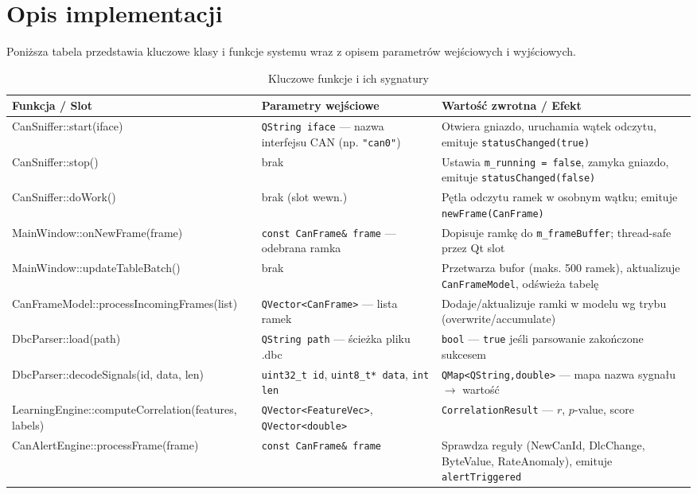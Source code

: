 \documentclass[12pt, a4paper]{article}
\begin{document}
\section{Opis implementacji}

Poniższa tabela przedstawia kluczowe klasy i funkcje systemu wraz z opisem
parametrów wejściowych i wyjściowych.

\begin{table}[H]
\caption{Kluczowe funkcje i ich sygnatury}
\label{tab:functions}
\centering
\small
\begin{tabular}{p{4.8cm}p{4.5cm}p{5.5cm}}
\toprule
\textbf{Funkcja / Slot} & \textbf{Parametry wejściowe} & \textbf{Wartość zwrotna / Efekt} \\
\midrule
\ttfamily CanSniffer::start(iface) &
  \texttt{QString iface} --- nazwa interfejsu CAN (np. \texttt{"can0"}) &
  Otwiera gniazdo, uruchamia wątek odczytu, emituje \texttt{statusChanged(true)} \\
\rowcolor{blue!3}
\ttfamily CanSniffer::stop() &
  brak &
  Ustawia \texttt{m\_running = false}, zamyka gniazdo, emituje \texttt{statusChanged(false)} \\
\ttfamily CanSniffer::doWork() &
  brak (slot wewn.) &
  Pętla odczytu ramek w osobnym wątku; emituje \texttt{newFrame(CanFrame)} \\
\rowcolor{blue!3}
\ttfamily MainWindow::onNewFrame(frame) &
  \texttt{const CanFrame\& frame} --- odebrana ramka &
  Dopisuje ramkę do \texttt{m\_frameBuffer}; thread-safe przez Qt slot \\
\ttfamily MainWindow::updateTableBatch() &
  brak &
  Przetwarza bufor (maks. 500 ramek), aktualizuje \texttt{CanFrameModel}, odświeża tabelę \\
\rowcolor{blue!3}
\ttfamily CanFrameModel::processIncomingFrames(list) &
  \texttt{QVector<CanFrame>} --- lista ramek &
  Dodaje/aktualizuje ramki w modelu wg trybu (overwrite/accumulate) \\
\ttfamily DbcParser::load(path) &
  \texttt{QString path} --- ścieżka pliku .dbc &
  \texttt{bool} --- \texttt{true} jeśli parsowanie zakończone sukcesem \\
\rowcolor{blue!3}
\ttfamily DbcParser::decodeSignals(id, data, len) &
  \texttt{uint32\_t id}, \texttt{uint8\_t* data}, \texttt{int len} &
  \texttt{QMap<QString,double>} --- mapa nazwa sygnału $\to$ wartość \\
\ttfamily LearningEngine::computeCorrelation(features, labels) &
  \texttt{QVector<FeatureVec>}, \texttt{QVector<double>} &
  \texttt{CorrelationResult} --- $r$, $p$-value, score \\
\rowcolor{blue!3}
\ttfamily CanAlertEngine::processFrame(frame) &
  \texttt{const CanFrame\& frame} &
  Sprawdza reguły (NewCanId, DlcChange, ByteValue, RateAnomaly), emituje \texttt{alertTriggered} \\
\bottomrule
\end{tabular}
\end{table}
\end{document}
